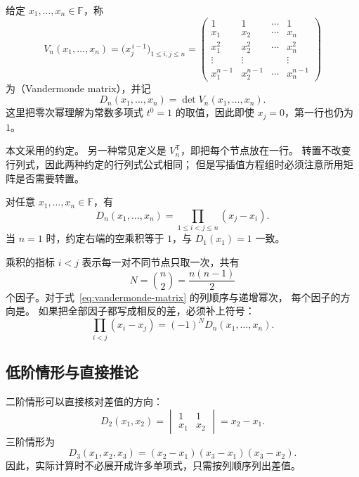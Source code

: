 \documentclass[UTF8,12pt,a4paper,fontset=fandol]{ctexart}
\begin{document}
\begin{definition}[范德蒙矩阵与范德蒙行列式]
\label{def:vandermonde}
给定 $x_1,\ldots,x_n\in\mathbb F$，称
\begin{equation}
  V_n(x_1,\ldots,x_n)
  =\bigl(x_j^{\,i-1}\bigr)_{1\leq i,j\leq n}
  =\begin{pmatrix}
    1&1&\cdots&1\\
    x_1&x_2&\cdots&x_n\\
    x_1^2&x_2^2&\cdots&x_n^2\\
    \vdots&\vdots&&\vdots\\
    x_1^{n-1}&x_2^{n-1}&\cdots&x_n^{n-1}
  \end{pmatrix}
  \label{eq:vandermonde-matrix}
\end{equation}
为（Vandermonde matrix），并记
\[
  D_n(x_1,\ldots,x_n)=\det V_n(x_1,\ldots,x_n).
\]
这里把零次幂理解为常数多项式 $t^0=1$ 的取值，因此即使 $x_j=0$，第一行也仍为 $1$。
\end{definition}

本文采用的约定。
另一种常见定义是 $V_n^{\mathsf T}$，即把每个节点放在一行。
转置不改变行列式，因此两种约定的行列式公式相同；
但是写插值方程组时必须注意所用矩阵是否需要转置。

\begin{theorem}[范德蒙行列式公式]
\label{thm:vandermonde}
对任意 $x_1,\ldots,x_n\in\mathbb F$，有
\begin{equation}
  D_n(x_1,\ldots,x_n)
  =\prod_{1\leq i<j\leq n}(x_j-x_i).
  \label{eq:vandermonde-product}
\end{equation}
当 $n=1$ 时，约定右端的空乘积等于 $1$，与 $D_1(x_1)=1$ 一致。
\end{theorem}

乘积的指标 $i<j$ 表示每一对不同节点只取一次，共有
\[
  N=\binom n2=\frac{n(n-1)}2
\]
个因子。对于式~\eqref{eq:vandermonde-matrix} 的列顺序与递增幂次，
每个因子的方向是。
如果把全部因子都写成相反的差，必须补上符号：
\begin{equation}
  \prod_{i<j}(x_i-x_j)=(-1)^N D_n(x_1,\ldots,x_n).
  \label{eq:reversed-differences}
\end{equation}

\subsection{低阶情形与直接推论}

二阶情形可以直接核对差值的方向：
\[
  D_2(x_1,x_2)=\begin{vmatrix}1&1\\x_1&x_2\end{vmatrix}=x_2-x_1.
\]
三阶情形为
\[
  D_3(x_1,x_2,x_3)
  =(x_2-x_1)(x_3-x_1)(x_3-x_2).
\]
因此，实际计算时不必展开成许多单项式，只需按列顺序列出差值。
\end{document}
